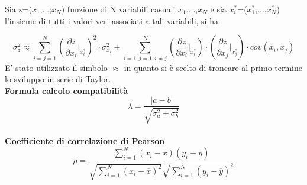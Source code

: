 \documentclass[a4paper,11pt,oneside]{article}
\begin{document}
Sia z=($x_1$,...;$x_N$) funzione di N variabili casuali $x_1$,...,$x_N$ e sia ${x_i^\ast}$=($x_1^\ast$,...,$x_N^{\ast}$) l'insieme di tutti i valori veri associati a tali variabili, si ha 

\begin{equation*}
    \sigma_z^{2}\approx  \sum_{i=j=1}^{N}\left ( \frac{\partial z}{\partial x_i}\Big|_{x_i^{\ast}} \right )^{2}\cdot\sigma_{x_i}^{2} +\sum_{i=1,j=1,i\neq j}^{N}\left (\frac{\partial z }{\partial x_i}\Big|_{x_i^{\ast}} \right ) \cdot \left ( \frac{\partial z}{\partial x_j} \Big|_{x_j^{\ast}} \right )\cdot cov(x_i,x_j)\label{eq:prop_errori}
\end{equation*}
E' stato utilizzato il simbolo $\approx$ in quanto si è scelto di troncare al primo termine lo sviluppo in serie di Taylor.\\


\textbf{Formula calcolo compatibilità}\\
\begin{equation*}
    \lambda=\frac{\left|a-b\right|}{\sqrt{\sigma^{2}_{a}+\sigma^{2}_{b}}}
\end{equation*}\\
\textbf{Coefficiente di correlazione di Pearson}\\
\begin{equation*}
    \rho=  \frac{\sum_{i=1}^{N}(x_i - \overline{x}
    )(y_i - \overline{y})}{\sqrt{\sum_{i=1}^{N}(x_i -\overline{x})^2}\sqrt{\sum_{i=1}^{N}(y_i - \overline{y})^2}}
\end{equation*}
\end{document}
